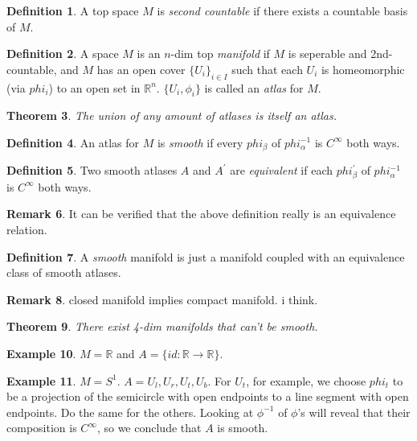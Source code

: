 \documentclass[11pt,leqno,oneside]{amsart}
\newcommand{\R}{{\mathbb R}} %
\newtheorem{thm}{Theorem}[section]
\theoremstyle{definition}
\newtheorem{defn}[thm]{Definition}
\newtheorem{example}[thm]{Example}
\newtheorem{rmk}[thm]{Remark}
\numberwithin{equation}{section}
\begin{document}
\begin{defn}
	A top space $M$ is \emph{second countable} if there exists a countable basis of $M$.
\end{defn}

\begin{defn}
	A space $M$ is an $n$-dim top \emph{manifold} if $M$ is seperable and 2nd-countable, and $M$ has an open cover $\{U_i\}_{i \in I}$ such that each $U_i$ is homeomorphic (via $phi_i$) to an open set in $\R^n$.  $\{ U_i, \phi_i \}$ is called an \emph{atlas} for $M$.
\end{defn}
\begin{thm}
	The union of any amount of atlases is itself an atlas.
\end{thm}

\begin{defn}
	An atlas for $M$ is \emph{smooth} if every $phi_\beta$ of $phi_\alpha^{-1}$ is $C^\infty$ both ways.
\end{defn}

\begin{defn}
	Two smooth atlases $A$ and $A^\prime$ are \emph{equivalent} if each $phi_\beta^\prime$ of $phi_\alpha^{-1}$ is $C^\infty$ both ways.
\end{defn}
\begin{rmk}
	It can be verified that the above definition really is an equivalence relation.
\end{rmk}

\begin{defn}
	A \emph{smooth} manifold is just a manifold coupled with an equivalence class of smooth atlases.
\end{defn}

\begin{rmk}
	closed manifold implies compact manifold.  i think.
\end{rmk}

\begin{thm}
	There exist 4-dim manifolds that can't be smooth.
\end{thm}



\begin{example}
	$M = \R$ and $A = \{ id: \R \to \R \}$.
\end{example}

\begin{example}
	$M = S^1$.  $A = {U_l, U_r, U_t, U_b}$.  For $U_t$, for example, we choose $phi_t$ to be a projection of the semicircle with open endpoints to a line segment with open endpoints.  Do the same for the others.  Looking at $\phi^{-1}$ of $\phi$'s will reveal that their composition is $C^\infty$, so we conclude that $A$ is smooth.
\end{example}
\end{document}
